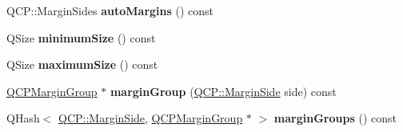 \begin{DoxyCompactItemize}
\item 
\hypertarget{classQCPLayoutElement_a2f499b1179b3126e22d0d7508124ccb3}{}Q\+C\+P\+::\+Margin\+Sides {\bfseries auto\+Margins} () const \label{classQCPLayoutElement_a2f499b1179b3126e22d0d7508124ccb3}

\item 
\hypertarget{classQCPLayoutElement_ae71f9230171d2d898e21dc461fc3df03}{}Q\+Size {\bfseries minimum\+Size} () const \label{classQCPLayoutElement_ae71f9230171d2d898e21dc461fc3df03}

\item 
\hypertarget{classQCPLayoutElement_a1fc85c79e15c2ab8051eccd455fccc4a}{}Q\+Size {\bfseries maximum\+Size} () const \label{classQCPLayoutElement_a1fc85c79e15c2ab8051eccd455fccc4a}

\item 
\hypertarget{classQCPLayoutElement_a22cb1bb62c452fd802e43ca2524660db}{}\hyperlink{classQCPMarginGroup}{Q\+C\+P\+Margin\+Group} $\ast$ {\bfseries margin\+Group} (\hyperlink{namespaceQCP_a7e487e3e2ccb62ab7771065bab7cae54}{Q\+C\+P\+::\+Margin\+Side} side) const \label{classQCPLayoutElement_a22cb1bb62c452fd802e43ca2524660db}

\item 
\hypertarget{classQCPLayoutElement_ac43921c997570389c14a1671bc3ea499}{}Q\+Hash$<$ \hyperlink{namespaceQCP_a7e487e3e2ccb62ab7771065bab7cae54}{Q\+C\+P\+::\+Margin\+Side}, \hyperlink{classQCPMarginGroup}{Q\+C\+P\+Margin\+Group} $\ast$ $>$ {\bfseries margin\+Groups} () const \label{classQCPLayoutElement_ac43921c997570389c14a1671bc3ea499}


\end{DoxyCompactItemize}

